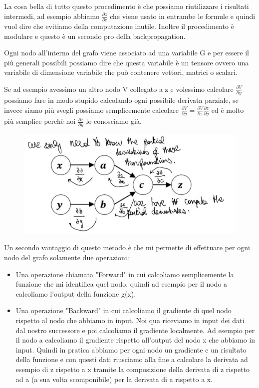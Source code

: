 \documentclass[14pt]{extreport}
\begin{document}
La cosa bella di tutto questo procedimento è che possiamo riutilizzare i risultati intermedi, ad esempio abbiamo $\frac{\partial z}{\partial c}$ che
viene usato in entrambe le formule e quindi vuol dire che evitiamo della computazione inutile. Inoltre il procedimento è modulare e questo è un
secondo pro della backpropagation.

Ogni nodo all'interno del grafo viene associato ad una variabile G e per essere il più generali possibili possiamo dire che questa variabile è un
tensore ovvero una variabile di dimensione variabile che può contenere vettori, matrici o scalari.

Se ad esempio avessimo un altro nodo V collegato a z e volessimo calcolare $\frac{\partial V}{\partial y}$ possiamo fare in modo stupido calcolando
ogni possibile derivata parziale, se invece siamo più svegli possiamo semplicemente calcolare $\frac{\partial V}{\partial y} = \frac{\partial
V}{\partial z}\frac{\partial z}{\partial y}$ ed è molto più semplice perchè noi $\frac{\partial z}{\partial y}$ lo conosciamo già.

\begin{figure}[H]
	\centering
	\includegraphics[width=0.7\linewidth]{388.jpeg}
\end{figure}

Un secondo vantaggio di questo metodo è che mi permette di effettuare per ogni nodo del grafo solamente due operazioni:
\begin{itemize}
	\item Una operazione chiamata "Forward" in cui calcoliamo semplicemente la funzione che mi identifica quel nodo, quindi ad esempio per il nodo a
	calcoliamo l'output della funzione g(x).
	\item Una operazione "Backward" in cui calcoliamo il gradiente di quel nodo rispetto al nodo che abbiamo in input. Noi qua riceviamo in input dei
	      dati dal nostro successore e poi calcoliamo il gradiente localmente. Ad esempio per il nodo a calcoliamo il gradiente rispetto all'output
	      del nodo x che abbiamo in input. Quindi in pratica abbiamo per ogni nodo un gradiente e un risultato della funzione e con questi dati
	      riusciamo alla fine a calcolare la derivata ad esempio di z rispetto a x tramite la composizione della derivata di z rispetto ad a (a sua
	      volta scomponibile) per la derivata di a rispetto a x.
\end{itemize}
\end{document}
